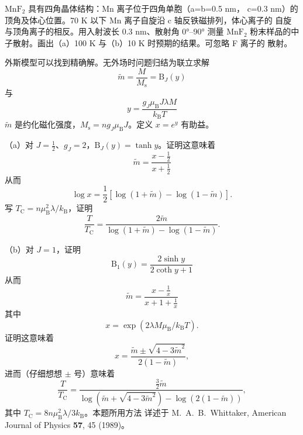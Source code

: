  $\mathrm{MnF_2}$ 具有四角晶体结构：Mn 离子位于四角单胞（a=b=0.5 nm，
c=0.3 nm）的顶角及体心位置。70 K 以下 Mn 离子自旋沿 c 轴反铁磁排列，体心离子的
自旋与顶角离子的相反。用入射波长 0.3 nm、散射角 0°--90° 测量 $\mathrm{MnF_2}$
粉末样品的中子散射。画出（a）100 K 与（b）10 K 时预期的结果。可忽略 F 离子的
散射。

 外斯模型可以找到精确解。无外场时问题归结为联立求解
\begin{equation*}
\tilde{m} = \frac{M}{M_{\mathrm{s}}} = \mathrm{B}_J(y)\tag{5.54}
\end{equation*}
与
\begin{equation*}
y = \frac{g_J\mu_{\mathrm{B}}J\lambda M}{k_{\mathrm{B}}T}\tag{5.55}
\end{equation*}
$\tilde{m}$ 是约化磁化强度，$M_{\mathrm{s}}=ng_J\mu_{\mathrm{B}}J$。定义 $x=e^{y}$
有助益。

（a）对 $J=\frac{1}{2}$、$g_J=2$，$\mathrm{B}_J(y)=\tanh y$。证明这意味着
\begin{equation*}
\tilde{m} = \frac{x-\frac{1}{2}}{x+\frac{1}{2}}\tag{5.56}
\end{equation*}
从而
\begin{equation*}
\log x = \frac{1}{2}\left[\log(1+\tilde{m})-\log(1-\tilde{m})\right].\tag{5.57}
\end{equation*}
写 $T_{\mathrm{C}}=n\mu_{\mathrm{B}}^{2}\lambda/k_{\mathrm{B}}$，证明
\begin{equation*}
\frac{T}{T_{\mathrm{C}}} = \frac{2\tilde{m}}{\log(1+\tilde{m})-\log(1-\tilde{m})}.\tag{5.58}
\end{equation*}

（b）对 $J=1$，证明
\begin{equation*}
\mathrm{B}_1(y) = \frac{2\sinh y}{2\coth y+1}\tag{5.59}
\end{equation*}
从而
\begin{equation*}
\tilde{m} = \frac{x-\frac{1}{x}}{x+1+\frac{1}{x}}\tag{5.60}
\end{equation*}
其中
\begin{equation*}
x = \exp(2\lambda M\mu_{\mathrm{B}}/k_{\mathrm{B}}T).\tag{5.61}
\end{equation*}
证明这意味着
\begin{equation*}
x = \frac{\tilde{m}\pm\sqrt{4-3\tilde{m}^{2}}}{2(1-\tilde{m})},\tag{5.62}
\end{equation*}
进而（仔细想想 $\pm$ 号）意味着
\begin{equation*}
\frac{T}{T_{\mathrm{C}}} = \frac{\frac{3}{2}\tilde{m}}{\log(\tilde{m}+\sqrt{4-3\tilde{m}^{2}})-\log(2(1-\tilde{m}))},\tag{5.63}
\end{equation*}
其中 $T_{\mathrm{C}}=8n\mu_{\mathrm{B}}^{2}\lambda/3k_{\mathrm{B}}$。本题所用方法
详述于 M.~A.~B.~Whittaker, American Journal of Physics \textbf{57}, 45 (1989)。
